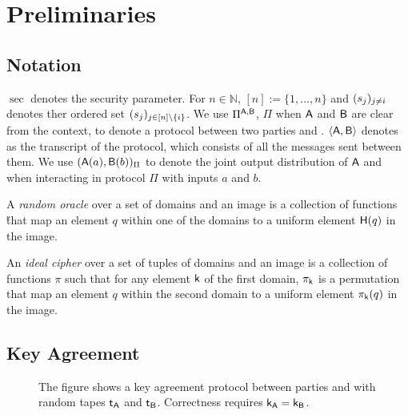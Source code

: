 \section{Preliminaries}

\subsection{Notation}
$\sec$ denotes the security parameter. For $n\in\mathbb N$, $[n]:=\{1,\dots,n\}$ and $(s_j)_{j\neq i}$ denotes ther ordered set  $(s_j)_{j\in[n]\setminus\{i\}}$. We use $\Pi^{\mathsf{A},\mathsf{B}}$, $\Pi$ when $\mathsf{A}$ and $\mathsf{B}$ are clear from the context,  to denote a protocol between two parties \A and \B. $\langle \mathsf{A},\mathsf{B}\rangle$ denotes as the transcript of the protocol, which consists of all the messages sent between them. We use $(\mathsf{A}(a),\mathsf{B}(b))_{\Pi}$ to denote the joint output distribution of $\mathsf{A}$ and \B when interacting in protocol $\Pi$ with inputs $a$ and $b$.


\begin{definition}
A \emph{random oracle} over a set of domains and an image is a collection of functions \H that map an element $q$ within one of the domains  to a uniform element $\mathsf{H}(q)$ in the image.  
\end{definition}


\begin{definition}
An \emph{ideal cipher} over a set of tuples of domains and an image is a collection of functions $\pi$ such that for any element $\mathsf{k}$ of the first domain, $\pi_\mathsf{k}$ is a permutation that map an element $q$ within the second domain to a uniform element $\pi_{\mathsf{k}}(q)$ in the image.  
\end{definition}

\subsection{Key Agreement}

\begin{figure}
\centering
{}
\myvspace{-0.3cm}
\caption{The figure shows a key agreement protocol between parties \A and \B with random tapes $\mathsf{t}_\mathsf{A}$ and $\mathsf{t}_\mathsf{B}$. Correctness requires $\mathsf{k}_\mathsf{A}=\mathsf{k}_\mathsf{B}$.}
 \label{fig:UKA}
\end{figure}


